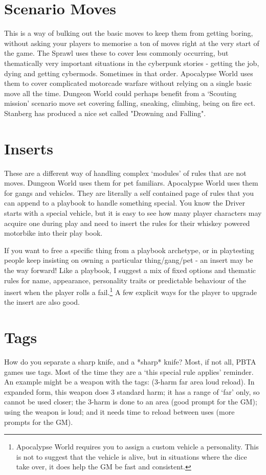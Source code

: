 \documentclass{tufte-handout}
\begin{document}
\section{Scenario Moves}
This is a way of bulking out the basic moves to keep them from getting boring, without asking your players to memorise a ton of moves right at the very start of the game.
The Sprawl uses these to cover less commonly occurring, but thematically very important situations in the cyberpunk stories - getting the job, dying and getting cybermods. Sometimes in that order.
Apocalypse World uses them to cover complicated motorcade warfare without relying on a single basic move all the time. 
Dungeon World could perhaps benefit from a `Scouting mission' scenario move set covering falling, sneaking, climbing, being on fire ect. Stanberg has produced a nice set called "Drowning and Falling". 


\section{Inserts}
These are a different way of handling complex `modules' of rules that are not moves. Dungeon World uses them for pet familiars. Apocalypse World uses them for gangs and vehicles. They are literally a self contained page of rules that you can append to a playbook to handle something special. 
You know the Driver starts with a special vehicle, but it is easy to see how many player characters may acquire one during play and need to insert the rules for their whiskey powered motorbike into their play book.

If you want to free a specific thing from a playbook archetype, or in playtesting people keep insisting on owning a particular thing/gang/pet -  an insert may be the way forward! 
Like a playbook, I suggest a mix of fixed options and thematic rules for name, appearance, personality traits or predictable behaviour of the insert when the player rolls a fail.\footnote{Apocalypse World requires you to assign a custom vehicle a personality. This is not to suggest that the vehicle is alive, but in situations where the dice take over, it does help the GM be fast and consistent.}  A few explicit ways for the player to upgrade the insert are also good. 

\section{Tags}
How do you separate a sharp knife, and a *sharp* knife? Most, if not all, PBTA games use tags. Most of the time they are a `this special rule applies' reminder. An example might be a weapon with the tags: (3-harm far area loud reload). In expanded form, this weapon does 3 standard harm; it has a range of `far' only, so cannot be used closer; the 3-harm is done to an area (good prompt for the GM); using the weapon is loud; and it needs time to reload between uses (more prompts for the GM).  
\end{document}
